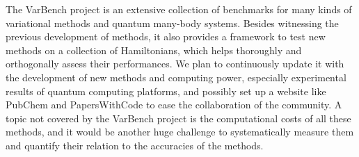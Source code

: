 The VarBench project is an extensive collection of benchmarks for many kinds of variational methods and quantum many-body systems. Besides witnessing the previous development of methods, it also provides a framework to test new methods on a collection of Hamiltonians, which helps thoroughly and orthogonally assess their performances. We plan to continuously update it with the development of new methods and computing power, especially experimental results of quantum computing platforms, and possibly set up a website like PubChem and PapersWithCode to ease the collaboration of the community. A topic not covered by the VarBench project is the computational costs of all these methods, and it would be another huge challenge to systematically measure them and quantify their relation to the accuracies of the methods.
